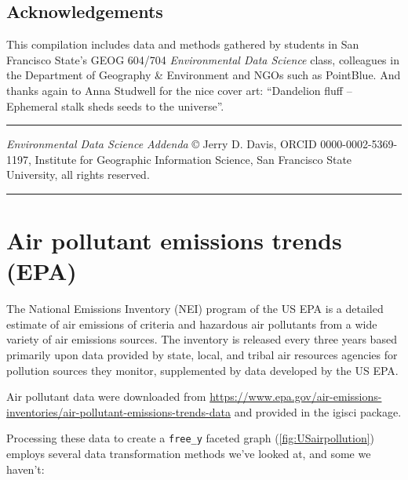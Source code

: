 \documentclass[
]{book}
\begin{document}
\hypertarget{acknowledgements}{%
\section{Acknowledgements}\label{acknowledgements}}

This compilation includes data and methods gathered by students in San Francisco State's GEOG 604/704 \emph{Environmental Data Science} class, colleagues in the Department of Geography \& Environment and NGOs such as PointBlue. And thanks again to Anna Studwell for the nice cover art: ``Dandelion fluff -- Ephemeral stalk sheds seeds to the universe''.

\begin{center}\rule{0.5\linewidth}{0.5pt}\end{center}

\emph{Environmental Data Science Addenda} © Jerry D. Davis, ORCID 0000-0002-5369-1197, Institute for Geographic Information Science, San Francisco State University, all rights reserved.

\begin{center}\rule{0.5\linewidth}{0.5pt}\end{center}

\hypertarget{air-pollutant-emissions-trends-epa}{%
\chapter{Air pollutant emissions trends (EPA)}\label{air-pollutant-emissions-trends-epa}}

The National Emissions Inventory (NEI) program of the US EPA is a detailed estimate of air emissions of criteria and hazardous air pollutants from a wide variety of air emissions sources. The inventory is released every three years based primarily upon data provided by state, local, and tribal air resources agencies for pollution sources they monitor, supplemented by data developed by the US EPA.

Air pollutant data were downloaded from \url{https://www.epa.gov/air-emissions-inventories/air-pollutant-emissions-trends-data} and provided in the igisci package.

Processing these data to create a \texttt{free\_y} faceted graph (\ref{fig:USairpollution}) employs several data transformation methods we've looked at, and some we haven't:
\end{document}
